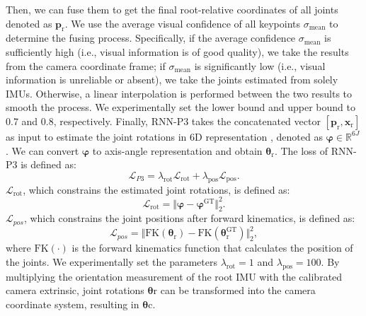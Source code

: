 \documentclass[sigconf,nonacm=true]{acmart}
\newcommand{\hl}[1]{{#1}}
\begin{document}
Then, we can fuse them to get the final root-relative coordinates of all joints denoted as $\boldsymbol{p}_{\mathrm{r}}$.
We use the average visual confidence of all keypoints $\sigma_{\mathrm{mean}}$ to determine the fusing process.
Specifically, if the average confidence $\sigma_{\mathrm{mean}}$ is sufficiently high (i.e., visual information is of good quality), we take the results from the camera coordinate frame;
if $\sigma_{\mathrm{mean}}$ is significantly low (i.e., visual information is unreliable or absent), we take the joints estimated from solely IMUs.
Otherwise, a linear interpolation is performed between the two results to smooth the process.
We experimentally set the lower bound and upper bound to 0.7 and 0.8, respectively.
Finally, RNN-P3 takes the concatenated vector $[\boldsymbol{p}_{\mathrm{r}},\boldsymbol{x}_{\mathrm{r}}]$ as input to estimate the joint rotations in 6D representation \cite{zhou2019continuity}, denoted as $\boldsymbol{\varphi}\in\mathbb{R}^{6J}$.
We can convert $\boldsymbol{\varphi}$ to axis-angle representation and obtain $\boldsymbol{\theta}_\mathrm{r}$.
The loss of RNN-P3 is defined as:
\begin{equation}
\mathcal{L}_{P3}=\lambda_{\mathrm{rot}}\mathcal{L}_{\mathrm{rot}}+\lambda_{\mathrm{pos}}\mathcal{L}_{\mathrm{pos}}.
\end{equation}
$\mathcal{L}_{\mathrm{rot}}$, which constrains the estimated joint rotations, is defined as:
\begin{equation}  
\mathcal{L}_{\mathrm{rot}}=\Vert \boldsymbol{\varphi}-\boldsymbol{\varphi}^{\mathrm{GT}} \Vert_2^{2}.
\end{equation}
$\mathcal{L}_{pos}$, which constrains the joint positions after forward kinematics, is defined as: 
\begin{equation}  
\mathcal{L}_{pos}=\Vert \mathrm{FK}\left(\boldsymbol{\theta}_{\mathrm{r}}\right)-\mathrm{FK}\left(\boldsymbol{\theta}_\mathrm{r}^{\mathrm{GT}}\right) \Vert_2^{2},
\end{equation}
where $\mathrm{FK}(\cdot)$ is the forward kinematics function that calculates the position of the joints.
We experimentally set the parameters $\lambda_{\mathrm{rot}}=1$ and $\lambda_{\mathrm{pos}}=100$.
\hl{By multiplying the orientation measurement of the root IMU with the calibrated camera extrinsic, joint rotations $\boldsymbol{\theta}\mathrm{r}$ can be transformed into the camera coordinate system, resulting in $\boldsymbol{\theta}\mathrm{c}$.}
\end{document}
